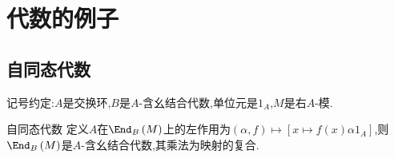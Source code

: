\chapter{代数的例子}

\section{自同态代数}

记号约定:$A$是交换环,$B$是$A$-含幺结合代数,单位元是$1_{A}$,$M$是右$A$-模.

\begin{proposition}{自同态代数}{}
	定义$A$在$\End_{B}\left(M\right)$上的左作用为$\left(\alpha,f\right)\mapsto\left[x\mapsto f\left(x\right)\alpha 1_{A}\right]$,则$\End_{B}\left(M\right)$是$A$-含幺结合代数,其乘法为映射的复合.
\end{proposition}